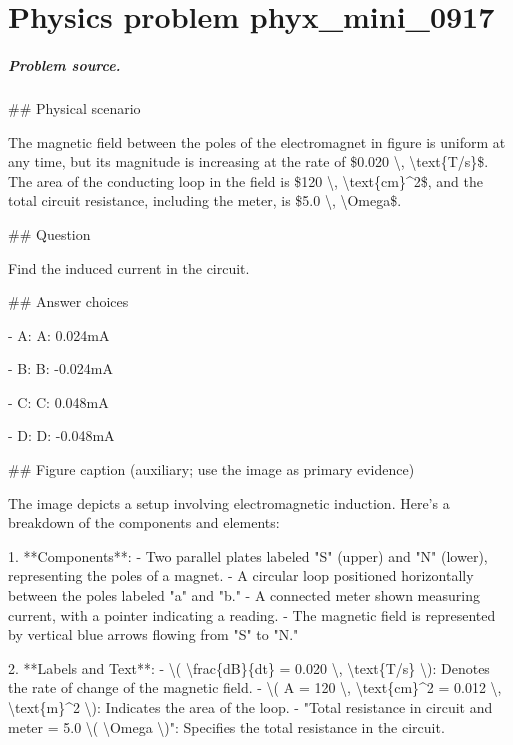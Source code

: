 
\chapter{Physics problem phyx\_mini\_0917}
\label{ch:PhyXMiniProblems_problem_phyx_mini_0917}

\paragraph{Problem source.}
\#\# Physical scenario

The magnetic field between the poles of the electromagnet in figure is uniform at any time, but its magnitude is increasing at the rate of \$0.020 \textbackslash{}, \textbackslash{}text\{T/s\}\$. The area of the conducting loop in the field is \$120 \textbackslash{}, \textbackslash{}text\{cm\}\textasciicircum{}2\$, and the total circuit resistance, including the meter, is \$5.0 \textbackslash{}, \textbackslash{}Omega\$.

\#\# Question

Find the induced current in the circuit.

\#\# Answer choices

- A: A: 0.024mA

- B: B: -0.024mA

- C: C: 0.048mA

- D: D: -0.048mA

\#\# Figure caption (auxiliary; use the image as primary evidence)

The image depicts a setup involving electromagnetic induction. Here's a breakdown of the components and elements:

1. **Components**:
   - Two parallel plates labeled "S" (upper) and "N" (lower), representing the poles of a magnet.
   - A circular loop positioned horizontally between the poles labeled "a" and "b." 
   - A connected meter shown measuring current, with a pointer indicating a reading.
   - The magnetic field is represented by vertical blue arrows flowing from "S" to "N."

2. **Labels and Text**:
   - \textbackslash{}( \textbackslash{}frac\{dB\}\{dt\} = 0.020 \textbackslash{}, \textbackslash{}text\{T/s\} \textbackslash{}): Denotes the rate of change of the magnetic field.
   - \textbackslash{}( A = 120 \textbackslash{}, \textbackslash{}text\{cm\}\textasciicircum{}2 = 0.012 \textbackslash{}, \textbackslash{}text\{m\}\textasciicircum{}2 \textbackslash{}): Indicates the area of the loop.
   - "Total resistance in circuit and meter = 5.0 \textbackslash{}( \textbackslash{}Omega \textbackslash{})": Specifies the total resistance in the circuit.

